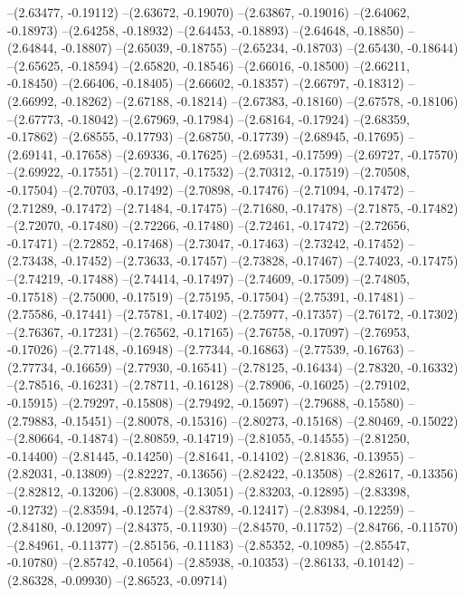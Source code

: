 --(2.63477, -0.19112)
--(2.63672, -0.19070)
--(2.63867, -0.19016)
--(2.64062, -0.18973)
--(2.64258, -0.18932)
--(2.64453, -0.18893)
--(2.64648, -0.18850)
--(2.64844, -0.18807)
--(2.65039, -0.18755)
--(2.65234, -0.18703)
--(2.65430, -0.18644)
--(2.65625, -0.18594)
--(2.65820, -0.18546)
--(2.66016, -0.18500)
--(2.66211, -0.18450)
--(2.66406, -0.18405)
--(2.66602, -0.18357)
--(2.66797, -0.18312)
--(2.66992, -0.18262)
--(2.67188, -0.18214)
--(2.67383, -0.18160)
--(2.67578, -0.18106)
--(2.67773, -0.18042)
--(2.67969, -0.17984)
--(2.68164, -0.17924)
--(2.68359, -0.17862)
--(2.68555, -0.17793)
--(2.68750, -0.17739)
--(2.68945, -0.17695)
--(2.69141, -0.17658)
--(2.69336, -0.17625)
--(2.69531, -0.17599)
--(2.69727, -0.17570)
--(2.69922, -0.17551)
--(2.70117, -0.17532)
--(2.70312, -0.17519)
--(2.70508, -0.17504)
--(2.70703, -0.17492)
--(2.70898, -0.17476)
--(2.71094, -0.17472)
--(2.71289, -0.17472)
--(2.71484, -0.17475)
--(2.71680, -0.17478)
--(2.71875, -0.17482)
--(2.72070, -0.17480)
--(2.72266, -0.17480)
--(2.72461, -0.17472)
--(2.72656, -0.17471)
--(2.72852, -0.17468)
--(2.73047, -0.17463)
--(2.73242, -0.17452)
--(2.73438, -0.17452)
--(2.73633, -0.17457)
--(2.73828, -0.17467)
--(2.74023, -0.17475)
--(2.74219, -0.17488)
--(2.74414, -0.17497)
--(2.74609, -0.17509)
--(2.74805, -0.17518)
--(2.75000, -0.17519)
--(2.75195, -0.17504)
--(2.75391, -0.17481)
--(2.75586, -0.17441)
--(2.75781, -0.17402)
--(2.75977, -0.17357)
--(2.76172, -0.17302)
--(2.76367, -0.17231)
--(2.76562, -0.17165)
--(2.76758, -0.17097)
--(2.76953, -0.17026)
--(2.77148, -0.16948)
--(2.77344, -0.16863)
--(2.77539, -0.16763)
--(2.77734, -0.16659)
--(2.77930, -0.16541)
--(2.78125, -0.16434)
--(2.78320, -0.16332)
--(2.78516, -0.16231)
--(2.78711, -0.16128)
--(2.78906, -0.16025)
--(2.79102, -0.15915)
--(2.79297, -0.15808)
--(2.79492, -0.15697)
--(2.79688, -0.15580)
--(2.79883, -0.15451)
--(2.80078, -0.15316)
--(2.80273, -0.15168)
--(2.80469, -0.15022)
--(2.80664, -0.14874)
--(2.80859, -0.14719)
--(2.81055, -0.14555)
--(2.81250, -0.14400)
--(2.81445, -0.14250)
--(2.81641, -0.14102)
--(2.81836, -0.13955)
--(2.82031, -0.13809)
--(2.82227, -0.13656)
--(2.82422, -0.13508)
--(2.82617, -0.13356)
--(2.82812, -0.13206)
--(2.83008, -0.13051)
--(2.83203, -0.12895)
--(2.83398, -0.12732)
--(2.83594, -0.12574)
--(2.83789, -0.12417)
--(2.83984, -0.12259)
--(2.84180, -0.12097)
--(2.84375, -0.11930)
--(2.84570, -0.11752)
--(2.84766, -0.11570)
--(2.84961, -0.11377)
--(2.85156, -0.11183)
--(2.85352, -0.10985)
--(2.85547, -0.10780)
--(2.85742, -0.10564)
--(2.85938, -0.10353)
--(2.86133, -0.10142)
--(2.86328, -0.09930)
--(2.86523, -0.09714)
